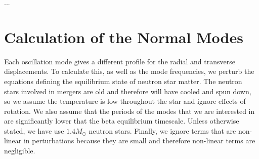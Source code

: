 \documentclass[fleqn,usenatbib]{mnras}
\begin{document}
...









\section{Calculation of the Normal Modes}
\hspace{\parindent}Each oscillation mode gives a different profile for the radial and transverse displacements. To calculate this, as well as the mode frequencies, we perturb the equations defining the equilibrium state of neutron star matter. The neutron stars involved in mergers are old and therefore will have cooled and spun down, so we assume the temperature is low throughout the star and ignore effects of rotation. We also assume that the periods of the modes that we are interested in are significantly lower that the beta equilibrium timescale. Unless otherwise stated, we have use $1.4M_{\odot}$ neutron stars. Finally, we ignore terms that are non-linear in perturbations because they are small and therefore non-linear terms are negligible.



\end{document}
